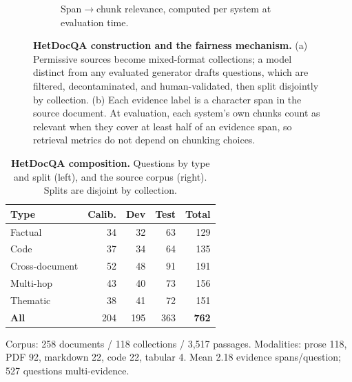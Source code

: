 \documentclass[10pt,twocolumn]{article}
\begin{document}
\begin{figure}[t]
\begin{subfigure}{\linewidth}
\begin{tikzpicture}[font=\scriptsize]
\end{tikzpicture}
\caption{Span$\rightarrow$chunk relevance, computed per system at evaluation time.}
\end{subfigure}
\caption{\textbf{HetDocQA construction and the fairness mechanism.} (a) Permissive
sources become mixed-format collections; a model distinct from any evaluated
generator drafts questions, which are filtered, decontaminated, and
human-validated, then split disjointly by collection. (b) Each evidence label is a
character span in the source document. At evaluation, each system's own chunks
count as relevant when they cover at least half of an evidence span, so retrieval
metrics do not depend on chunking choices.}
\label{fig:construction}
\end{figure}

\begin{table}[t]
\centering
\small
\caption{\textbf{HetDocQA composition.} Questions by type and split (left), and
the source corpus (right). Splits are disjoint by collection.}
\label{tab:composition}
\begin{tabular}{@{}lrrrr@{}}
\toprule
\textbf{Type} & \textbf{Calib.} & \textbf{Dev} & \textbf{Test} & \textbf{Total}\\
\midrule
Factual         & 34 & 32 & 63 & 129\\
Code            & 37 & 34 & 64 & 135\\
Cross-document  & 52 & 48 & 91 & 191\\
Multi-hop       & 43 & 40 & 73 & 156\\
Thematic        & 38 & 41 & 72 & 151\\
\midrule
\textbf{All}    & 204 & 195 & 363 & \textbf{762}\\
\bottomrule
\end{tabular}
\vspace{2pt}
{\footnotesize\par\noindent Corpus: 258 documents / 118 collections / 3{,}517
passages. Modalities: prose 118, PDF 92, markdown 22, code 22, tabular 4.
Mean 2.18 evidence spans/question; 527 questions multi-evidence.}
\end{table}

\end{document}
